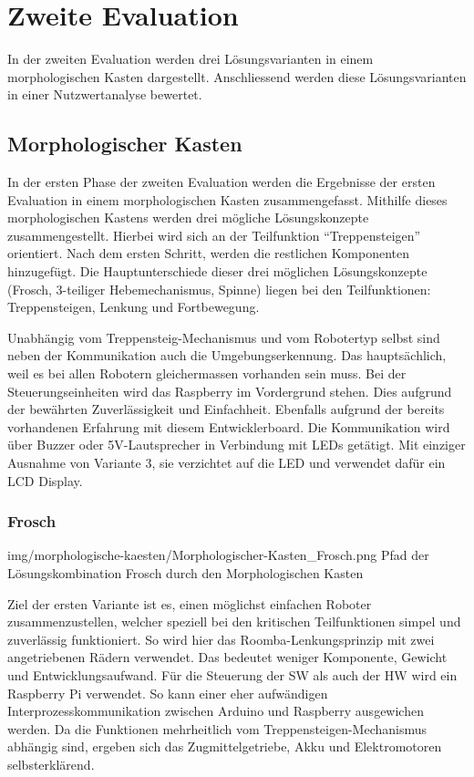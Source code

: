 \section{Zweite Evaluation}
In der zweiten Evaluation werden drei Lösungsvarianten in einem morphologischen Kasten dargestellt. Anschliessend werden diese Lösungsvarianten in einer Nutzwertanalyse bewertet.
\subsection{Morphologischer Kasten}
In der ersten Phase der zweiten Evaluation werden die Ergebnisse der ersten Evaluation in einem morphologischen Kasten zusammengefasst. Mithilfe dieses morphologischen Kastens werden drei mögliche Lösungskonzepte zusammengestellt. Hierbei wird sich an der Teilfunktion ``Treppensteigen'' orientiert. Nach dem ersten Schritt, werden die restlichen Komponenten hinzugefügt. Die Hauptunterschiede dieser drei möglichen Lösungskonzepte (Frosch, 3-teiliger Hebemechanismus, Spinne) liegen bei den Teilfunktionen: Treppensteigen, Lenkung und Fortbewegung.

Unabhängig vom Treppensteig-Mechanismus und vom Robotertyp selbst sind neben der Kommunikation auch die Umgebungserkennung. Das hauptsächlich, weil es bei allen Robotern gleichermassen vorhanden sein muss. Bei der Steuerungseinheiten wird das Raspberry im Vordergrund stehen. Dies aufgrund der bewährten Zuverlässigkeit und Einfachheit. Ebenfalls aufgrund der bereits vorhandenen Erfahrung mit diesem Entwicklerboard. Die Kommunikation wird über Buzzer oder 5V-Lautsprecher in Verbindung mit LEDs getätigt. Mit einziger Ausnahme von Variante 3, sie verzichtet auf die LED und verwendet dafür ein LCD Display.

\subsubsection{Frosch}
\image
   {img/morphologische-kaesten/Morphologischer-Kasten_Frosch.png}
   {Pfad der Lösungskombination Frosch durch den Morphologischen Kasten}
   
Ziel der ersten Variante ist es, einen möglichst einfachen Roboter zusammenzustellen, welcher speziell bei den kritischen Teilfunktionen simpel und zuverlässig funktioniert. So wird hier das Roomba-Lenkungsprinzip mit zwei angetriebenen Rädern verwendet. Das bedeutet weniger Komponente, Gewicht und Entwicklungsaufwand. 
Für die  Steuerung der SW als auch der HW wird ein Raspberry Pi verwendet. So kann einer eher aufwändigen Interprozesskommunikation zwischen Arduino und Raspberry ausgewichen werden. 
Da die Funktionen mehrheitlich vom Treppensteigen-Mechanismus abhängig sind, ergeben sich das Zugmittelgetriebe, Akku und Elektromotoren selbsterklärend. 

